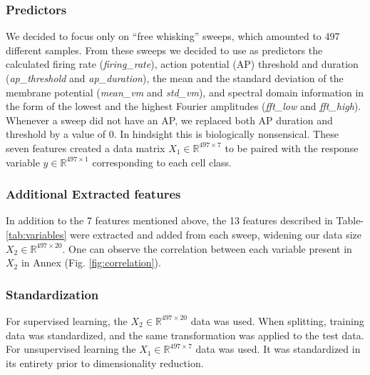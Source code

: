 \documentclass{IEEEtran}
\begin{document}
\subsubsection{Predictors}

We decided to focus only on “free whisking” sweeps, which amounted to 497 different samples.
From these sweeps we decided to use as predictors the calculated firing rate (\textit{firing\_rate}), action potential (AP) threshold and duration (\textit{ap\_threshold} and \textit{ap\_duration}), the mean and the standard deviation of the membrane potential (\textit{mean\_vm} and \textit{std\_vm}), and spectral domain information in the form of the lowest and the highest Fourier amplitudes (\textit{fft\_low} and \textit{fft\_high}).
Whenever a sweep did not have an AP, we replaced both AP duration and threshold by a value of 0. In hindsight this is biologically nonsensical.
These seven features created a data matrix $X_1 \in \mathbb{R}^{497\times7}$ to be paired with the response variable $y \in \mathbb{R}^{497\times1}$ corresponding to each cell class.

\subsubsection{Additional Extracted features}
In addition to the 7 features mentioned above, the 13 features described in Table-\ref{tab:variables} were extracted and added from each sweep, widening our data size $X_2 \in \mathbb{R}^{497\times20}$.
One can observe the correlation between each variable present in $X_2$ in Annex (Fig. \ref{fig:correlation}). 

\subsubsection{Standardization}
For supervised learning, the $X_2 \in \mathbb{R}^{497\times20}$ data was used. When splitting, training data was standardized, and the same transformation was applied to the test data.
For unsupervised learning the $X_1 \in \mathbb{R}^{497\times7}$ data was used. It was standardized in its entirety prior to dimensionality reduction.
\end{document}
